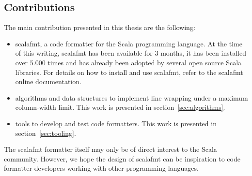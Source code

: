 
\subsection{Contributions}
The main contribution presented in this thesis are the following:
\begin{itemize}
  \item scalafmt, a code formatter for the Scala programming language.
    At the time of this writing, scalafmt has been available for 3 months, it has been installed over 5.000 times and has already been adopted by several open source Scala libraries.
    For details on how to install and use scalafmt, refer to the scalafmt online documentation\autocite{geirsson_scalafmt_????}.

  \item algorithms and data structures to implement line wrapping under a maximum column-width limit.
    This work is presented in section~\ref{sec:algorithms}.
  \item tools to develop and test code formatters.
    This work is presented in section~\ref{sec:tooling}.
\end{itemize}
The scalafmt formatter itself may only be of direct interest to the Scala community.
However, we hope the design of scalafmt can be inspiration to code formatter developers working with other programming languages.

